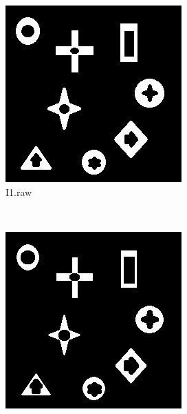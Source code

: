 \documentclass{article}
\begin{document}
\begin{enumerate}[label=(\alph*)]
        \begin{figure}[!htb]
            \centering
            \begin{subfigure}[b]{0.3\textwidth}
                \includegraphics[width=\textwidth]{img/I1.png}
                \caption{I1.raw}
            \end{subfigure}
            ~
            \begin{subfigure}[b]{0.3\textwidth}
                \includegraphics[width=\textwidth]{img/I1H.png}

\end{subfigure}
\end{figure}
\end{enumerate}
\end{document}
